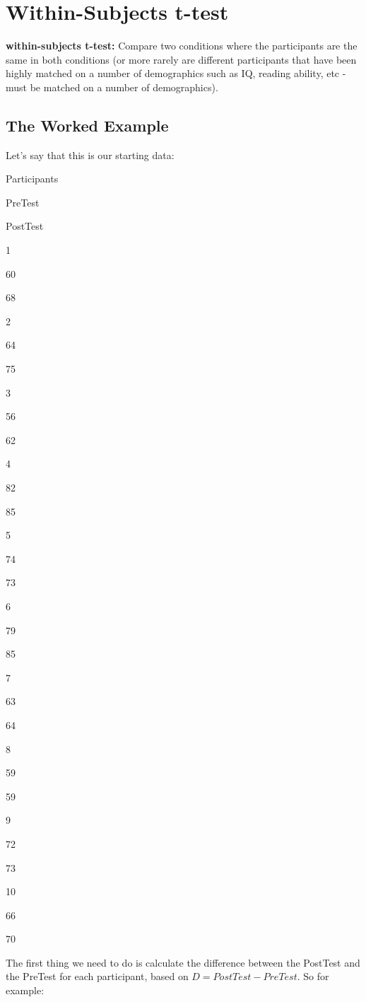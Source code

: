 \documentclass[
  oneside]{book}
\begin{document}
\hypertarget{within-subjects-t-test}{%
\chapter{Within-Subjects t-test}\label{within-subjects-t-test}}

\textbf{within-subjects t-test:} Compare two conditions where the participants are the same in both conditions (or more rarely are different participants that have been highly matched on a number of demographics such as IQ, reading ability, etc - must be matched on a number of demographics).

\hypertarget{the-worked-example-3}{%
\section{The Worked Example}\label{the-worked-example-3}}

Let's say that this is our starting data:

Participants

PreTest

PostTest

1

60

68

2

64

75

3

56

62

4

82

85

5

74

73

6

79

85

7

63

64

8

59

59

9

72

73

10

66

70

The first thing we need to do is calculate the difference between the PostTest and the PreTest for each participant, based on \(D = PostTest - PreTest\). So for example:
\end{document}
